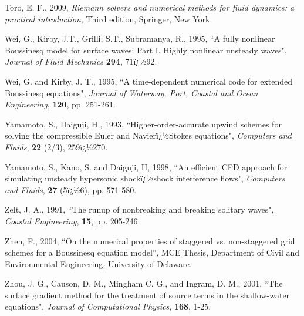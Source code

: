 \documentclass[11pt]{article}
\begin{document}
\begin{description}
\item Toro, E. F., 2009, {\em Riemann solvers and numerical methods for fluid dynamics: a practical introduction}, Third edition, Springer, New York. 

\item Wei, G., Kirby, J.T., Grilli, S.T., Subramanya, R., 1995,  ``A fully nonlinear Boussinesq model for surface waves: Part I. Highly nonlinear unsteady waves", {\em  Journal of Fluid
Mechanics}  {\bf 294}, 71ï¿½92.

\item Wei, G. and Kirby, J. T., 1995, ``A time-dependent numerical code for extended Boussinesq equations",  {\em Journal of Waterway, Port, Coastal and Ocean Engineering},  {\bf 120}, pp. 251-261.

\item
Yamamoto, S., Daiguji, H., 1993, ``Higher-order-accurate upwind schemes for solving 
the compressible Euler and Navierï¿½Stokes equations", {\em Computers and Fluids}, {\bf  22} 
(2/3), 259ï¿½270. 


\item Yamamoto, S., Kano, S. and Daiguji, H, 1998, ``An efficient CFD approach for simulating unsteady hypersonic shockï¿½shock interference flows", {\em Computers and Fluids},  {\bf 27} (5ï¿½6), pp. 571-580. 

\item Zelt, J. A., 1991, ``The runup of nonbreaking and breaking solitary waves",  {\em Coastal Engineering},  {\bf 15}, pp. 205-246.

\item Zhen, F., 2004, ``On the numerical properties of staggered vs. non-staggered grid schemes for a Boussinesq equation model'', MCE Thesis, Department of Civil and Environmental Engineering, University of Delaware.

\item Zhou, J. G., Causon, D. M., Mingham C. G., and Ingram, D. M., 2001, ``The surface gradient method for the treatment of source terms in the shallow-water equations", {\em Journal of Computational Physics}, {\bf 168}, 1-25.

\end{description}

\end{document}
